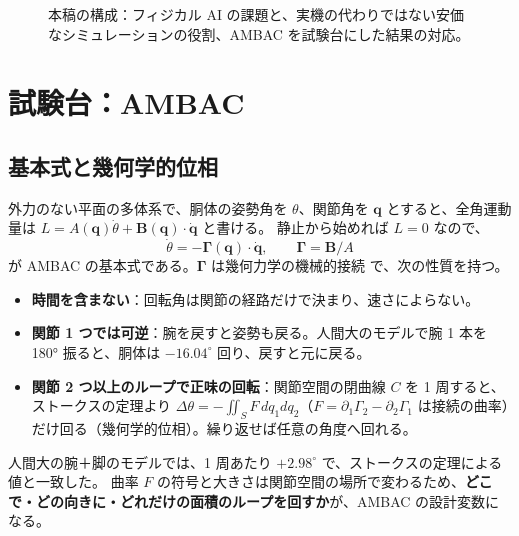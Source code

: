 \documentclass[paper=a4paper,fontsize=10pt,twocolumn,column_gap=2zw,line_length=24zw,number_of_lines=46,head_space=20mm]{jlreq}
\begin{document}
\begin{figure}[t]
\caption{本稿の構成：フィジカル AI の課題と、実機の代わりではない安価なシミュレーションの役割、AMBAC を試験台にした結果の対応。}\label{fig:overview}
\end{figure}


\section{試験台：AMBAC}

\subsection{基本式と幾何学的位相}
外力のない平面の多体系で、胴体の姿勢角を $\theta$、関節角を $\bm q$ とすると、全角運動量は $L = A(\bm q)\dot\theta + \bm B(\bm q)\cdot\dot{\bm q}$ と書ける。
静止から始めれば $L=0$ なので、
\begin{equation}
\dot\theta = -\bm\Gamma(\bm q)\cdot\dot{\bm q},\qquad \bm\Gamma = \bm B/A
\label{eq:ambac}
\end{equation}
が AMBAC の基本式である。$\bm\Gamma$ は幾何力学の機械的接続 \cite{marsden1992} で、次の性質を持つ。
\begin{itemize}\setlength{\itemsep}{0pt}
\item \textbf{時間を含まない}：回転角は関節の経路だけで決まり、速さによらない。
\item \textbf{関節 1 つでは可逆}：腕を戻すと姿勢も戻る。人間大のモデルで腕 1 本を 180° 振ると、胴体は $-16.04^\circ$ 回り、戻すと元に戻る。
\item \textbf{関節 2 つ以上のループで正味の回転}：関節空間の閉曲線 $C$ を 1 周すると、ストークスの定理より
$\Delta\theta = -\iint_S F\,dq_1dq_2$（$F=\partial_1\Gamma_2-\partial_2\Gamma_1$ は接続の曲率）だけ回る（幾何学的位相）。繰り返せば任意の角度へ回れる。
\end{itemize}
人間大の腕＋脚のモデルでは、1 周あたり $+2.98^\circ$ で、ストークスの定理による値と一致した。
曲率 $F$ の符号と大きさは関節空間の場所で変わるため、\textbf{どこで・どの向きに・どれだけの面積のループを回すか}が、AMBAC の設計変数になる。
\end{document}
